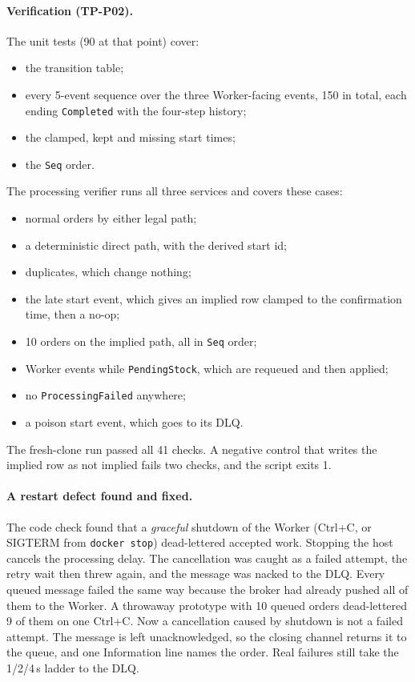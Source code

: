\documentclass[a4paper]{report}
\begin{document}
\paragraph{Verification (TP-P02).} The unit tests (90 at that point) cover:
\begin{itemize}
  \item the transition table;
  \item every 5-event sequence over the three Worker-facing events, 150 in
    total, each ending \texttt{Completed} with the four-step history;
  \item the clamped, kept and missing start times;
  \item the \texttt{Seq} order.
\end{itemize}
The processing verifier runs all three services and covers
these cases:
\begin{itemize}
  \item normal orders by either legal path;
  \item a deterministic direct path, with the derived start id;
  \item duplicates, which change nothing;
  \item the late start event, which gives an implied row clamped to the
    confirmation time, then a no-op;
  \item 10 orders on the implied path, all in \texttt{Seq} order;
  \item Worker events while \texttt{PendingStock}, which are requeued and
    then applied;
  \item no \texttt{ProcessingFailed} anywhere;
  \item a poison start event, which goes to its DLQ.
\end{itemize}
The fresh-clone run passed all 41 checks. A negative control that writes the
implied row as not implied fails two checks, and the script exits 1.

\paragraph{A restart defect found and fixed.} The code check found that a
\emph{graceful} shutdown of the Worker (Ctrl+C, or SIGTERM from
\texttt{docker stop}) dead-lettered accepted work. Stopping the host cancels
the processing delay. The cancellation was caught as a failed attempt, the
retry wait then threw again, and the message was nacked to the DLQ. Every
queued message failed the same way because the broker had already pushed all
of them to the Worker. A throwaway prototype with 10 queued orders
dead-lettered 9 of them on one Ctrl+C. Now a cancellation caused by
shutdown is not a failed attempt. The message is left unacknowledged, so
the closing channel returns it to the queue, and one Information line names
the order. Real failures still take the 1/2/4\,s ladder to the DLQ.
\end{document}
